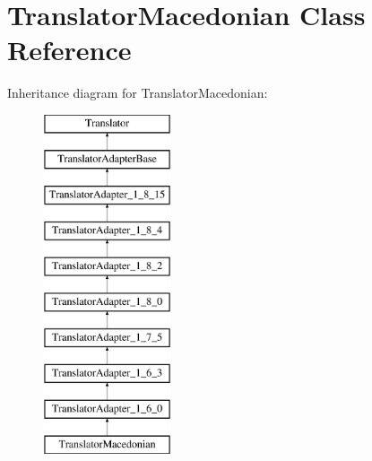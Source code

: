 \hypertarget{class_translator_macedonian}{}\section{Translator\+Macedonian Class Reference}
\label{class_translator_macedonian}
Inheritance diagram for Translator\+Macedonian\+:\begin{figure}[H]
\begin{center}
\leavevmode
\includegraphics[height=10.000000cm]{class_translator_macedonian}
\end{center}
\end{figure}
